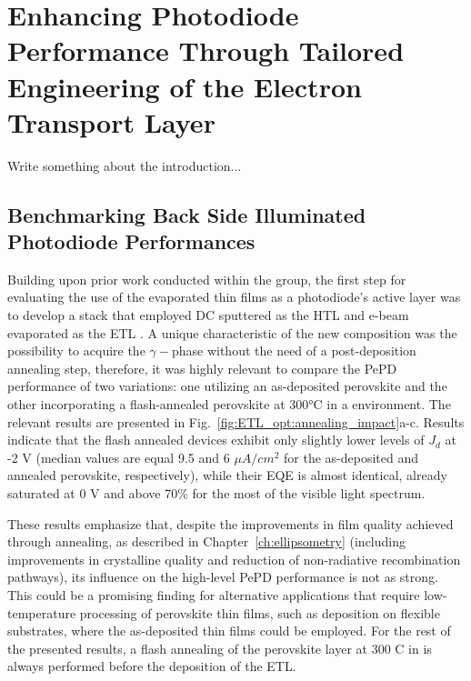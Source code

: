 \chapter{Enhancing Photodiode Performance Through Tailored Engineering of the Electron Transport Layer}\label{ch:transport_layer}


Write something about the introduction...


\section{Benchmarking Back Side Illuminated Photodiode Performances}

Building upon prior work conducted within the group, the first step for evaluating the use of the evaporated  thin films as a photodiode's active layer was to develop a stack that employed DC sputtered  as the HTL and e-beam evaporated  as the ETL \cite{PintorMonroy2021All-EvaporatedApplications}. A unique characteristic of the new composition was the possibility to acquire the $\gamma-$phase without the need of a post-deposition annealing step, therefore, it was highly relevant to compare the PePD performance of two variations: one utilizing an as-deposited perovskite and the other incorporating a flash-annealed perovskite at 300°C in a  environment. The relevant results are presented in Fig.~\ref{fig:ETL_opt:annealing_impact}a-c. Results indicate that the flash annealed devices exhibit only slightly lower levels of $J_d$ at -2 V (median values are equal 9.5 and 6 $\mu A/cm^2$ for the as-deposited and annealed perovskite, respectively), while their EQE is almost identical, already saturated at 0 V and above 70\% for the most of the visible light spectrum. 

These results emphasize that, despite the improvements in film quality achieved through annealing, as described in Chapter~\ref{ch:ellipsometry} (including improvements in crystalline quality and reduction of non-radiative recombination pathways), its influence on the high-level PePD performance is not as strong. This could be a promising finding for alternative applications that require low-temperature processing of perovskite thin films, such as deposition on flexible substrates, where the as-deposited  thin films could be employed. For the rest of the presented results, a flash annealing of the perovskite layer at 300 \degree C in  is always performed before the deposition of the ETL. 

